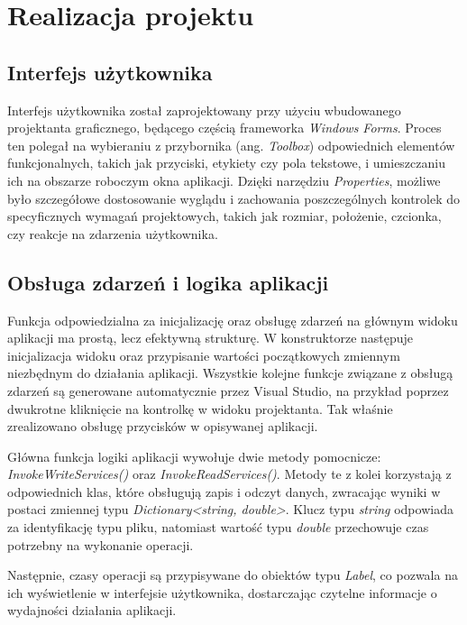 \documentclass{report}
\begin{document}
\section{\LARGE Realizacja projektu}

\subsection{\Large Interfejs użytkownika}

Interfejs użytkownika został zaprojektowany przy użyciu wbudowanego projektanta graficznego, będącego częścią frameworka \textit{Windows Forms}. Proces ten polegał na wybieraniu z przybornika (ang. \textit{Toolbox}) odpowiednich elementów funkcjonalnych, takich jak przyciski, etykiety czy pola tekstowe, i umieszczaniu ich na obszarze roboczym okna aplikacji. Dzięki narzędziu \textit{Properties}, możliwe było szczegółowe dostosowanie wyglądu i zachowania poszczególnych kontrolek do specyficznych wymagań projektowych, takich jak rozmiar, położenie, czcionka, czy reakcje na zdarzenia użytkownika.

\subsection{\Large Obsługa zdarzeń i logika aplikacji}

Funkcja odpowiedzialna za inicjalizację oraz obsługę zdarzeń na głównym widoku aplikacji ma prostą, lecz efektywną strukturę. W konstruktorze następuje inicjalizacja widoku oraz przypisanie wartości początkowych zmiennym niezbędnym do działania aplikacji. Wszystkie kolejne funkcje związane z obsługą zdarzeń są generowane automatycznie przez Visual Studio, na przykład poprzez dwukrotne kliknięcie na kontrolkę w widoku projektanta. Tak właśnie zrealizowano obsługę przycisków w opisywanej aplikacji.

Główna funkcja logiki aplikacji wywołuje dwie metody pomocnicze: \textit{InvokeWriteServices()} oraz \textit{InvokeReadServices()}. Metody te z kolei korzystają z odpowiednich klas, które obsługują zapis i odczyt danych, zwracając wyniki w postaci zmiennej typu \textit{Dictionary<string, double>}. Klucz typu \textit{string} odpowiada za identyfikację typu pliku, natomiast wartość typu \textit{double} przechowuje czas potrzebny na wykonanie operacji.

Następnie, czasy operacji są przypisywane do obiektów typu \textit{Label}, co pozwala na ich wyświetlenie w interfejsie użytkownika, dostarczając czytelne informacje o wydajności działania aplikacji.
\end{document}
